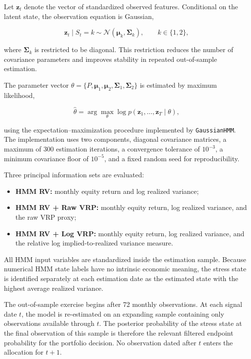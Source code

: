Let $\mathbf{z}_t$ denote the vector of standardized observed features. Conditional on the latent
state, the observation equation is Gaussian,

\begin{equation}
\mathbf{z}_t
\mid
S_t=k
\sim
\mathcal{N}
\left(
\boldsymbol{\mu}_k,
\boldsymbol{\Sigma}_k
\right),
\qquad
k\in\{1,2\},
\end{equation}

where $\boldsymbol{\Sigma}_k$ is restricted to be diagonal. This restriction reduces the number
of covariance parameters and improves stability in repeated out-of-sample estimation.

The parameter vector
$\theta=\{P,\boldsymbol{\mu}_1,\boldsymbol{\mu}_2,
\boldsymbol{\Sigma}_1,\boldsymbol{\Sigma}_2\}$
is estimated by maximum likelihood,

\begin{equation}
\widehat{\theta}
=
\arg\max_{\theta}
\log
p
\left(
\mathbf{z}_1,\ldots,\mathbf{z}_T
\mid
\theta
\right),
\end{equation}

using the expectation--maximization procedure implemented by
\texttt{GaussianHMM}. The implementation uses two components, diagonal covariance matrices,
a maximum of 300 estimation iterations, a convergence tolerance of $10^{-3}$, a minimum
covariance floor of $10^{-5}$, and a fixed random seed for reproducibility.

Three principal information sets are evaluated:

\begin{itemize}
    \item \textbf{HMM RV:}
    monthly equity return and log realized variance;

    \item \textbf{HMM RV + Raw VRP:}
    monthly equity return, log realized variance, and the raw VRP proxy;

    \item \textbf{HMM RV + Log VRP:}
    monthly equity return, log realized variance, and the relative log implied-to-realized
    variance measure.
\end{itemize}

All HMM input variables are standardized inside the estimation sample. Because numerical HMM
state labels have no intrinsic economic meaning, the stress state is identified separately at each
estimation date as the estimated state with the highest average realized variance.

The out-of-sample exercise begins after 72 monthly observations. At each signal date $t$, the
model is re-estimated on an expanding sample containing only observations available through
$t$. The posterior probability of the stress state at the final observation of this sample is therefore
the relevant filtered endpoint probability for the portfolio decision. No observation dated after
$t$ enters the allocation for $t+1$.


